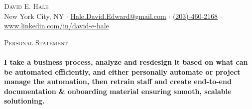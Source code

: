 \documentclass[a4paper]{article}
\newcommand{\lineunder} {
    \vspace*{-8pt} \\
    \hspace*{-18pt} \hrulefill \\
}
\newcommand{\header} [1] {
    {\hspace*{-18pt}\vspace*{6pt} \textsc{#1}}
    \vspace*{-6pt} \lineunder
}
\begin{document}
\vspace*{-40pt}

    

\vspace*{-9pt}
\begin{center}
	{\Large \scshape {David E. Hale}}\\
	New York City, NY $\cdot$ \href{mailto:Hale.David.Edward@gmail.com}{Hale.David.Edward@gmail.com} $\cdot$ \href{tel:203-460-2168}{(203)-460-2168} $\cdot$ \href{www.linkedin.com/in/david-e-hale}{www.linkedin.com/in/david-e-hale}
\end{center}

\header{Personal Statement}
\vspace{1mm}
\textbf{I take a business process, analyze and resdesign it based on what can be automated efficiently, and either personally automate or project manage the automation,
        then retrain staff and create end-to-end documentation \& onboarding material ensuring smooth, scalable solutioning.
}
\end{document}
